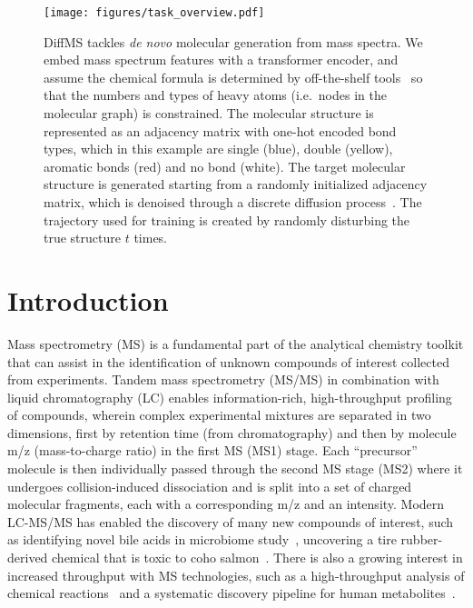 \documentclass{article}
\theoremstyle{plain}
\theoremstyle{definition}
\theoremstyle{remark}
\begin{document}
\begin{figure*}[tb!]
    \centering
    \texttt{[image: figures/task\_overview.pdf]}
    \caption{DiffMS tackles \textit{de novo} molecular generation from mass spectra. We embed mass spectrum features with a transformer encoder, and assume the chemical formula is determined by off-the-shelf tools~\citep{goldman2023mist-cf,bocker2016fragmentation} so that the numbers and types of heavy atoms (i.e.\ nodes in the molecular graph) is constrained. The molecular structure is represented as an adjacency matrix with one-hot encoded bond types, which in this example are single (blue), double (yellow), aromatic bonds (red) and no bond (white). The target molecular structure is generated starting from a randomly initialized adjacency matrix, which is denoised through a discrete diffusion process~\citep{vignac2023digress}. The trajectory used for training is created by randomly disturbing the true structure $t$ times.}
    \label{fig:task_overview}
\end{figure*}

\section{Introduction}
\label{intro}

Mass spectrometry (MS) is a fundamental part of the analytical chemistry toolkit that can assist in the identification of unknown compounds of interest collected from experiments. Tandem mass spectrometry (MS/MS) in combination with liquid chromatography (LC) enables information-rich, high-throughput profiling of compounds, wherein complex experimental mixtures are separated in two dimensions, first by retention time (from chromatography) and then by molecule m/z (mass-to-charge ratio) in the first MS (MS1) stage. 
Each ``precursor'' molecule is then individually passed through the second MS stage (MS2) where it undergoes collision-induced dissociation and is split into a set of charged molecular fragments, each with a corresponding m/z and an intensity. 
Modern LC-MS/MS has enabled the discovery of many new compounds of interest, such as identifying novel bile acids in microbiome study~\citep{quinn2020global}, uncovering a tire rubber-derived chemical that is toxic to coho salmon~\citep{tian2021ubiquitous}. There is also a growing interest in increased throughput with MS technologies, such as a high-throughput analysis of chemical reactions~\citep{hu2024continuous} and a systematic discovery pipeline for human metabolites~\citep{gentry2024reverse}.
\end{document}
